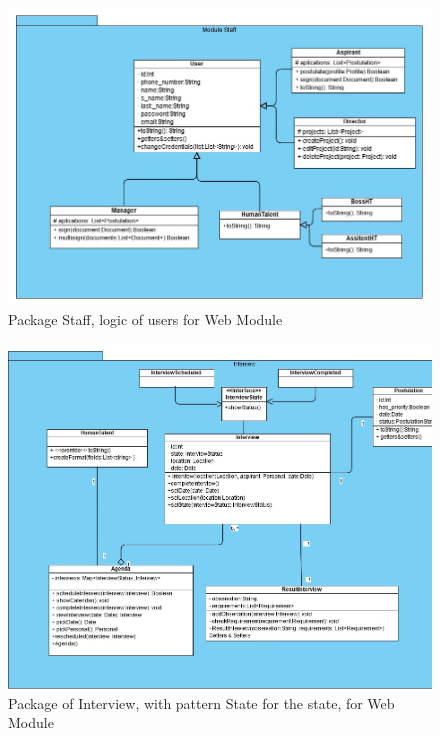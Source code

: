 \documentclass{scrreprt}
\begin{document}
\begin{figure}[H]
	\centering  \small
	\includegraphics[width=\textwidth]{DC/DC2.jpg} 
	\caption{Package Staff, logic of users for Web Module}
	\label{fig:Clase2}
\end{figure}

\begin{figure}[H]
	\centering  \small
	\includegraphics[width=\textwidth]{DC/DC3.jpg} 
	\caption{Package of Interview, with pattern State for the state, for Web Module}
	\label{fig:Clase3}
\end{figure}
\end{document}
